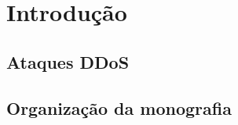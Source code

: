 \chapter[Introdução]{Introdução}
\label{introducao}



\section{Ataques DDoS}


\section{Organização da monografia}

